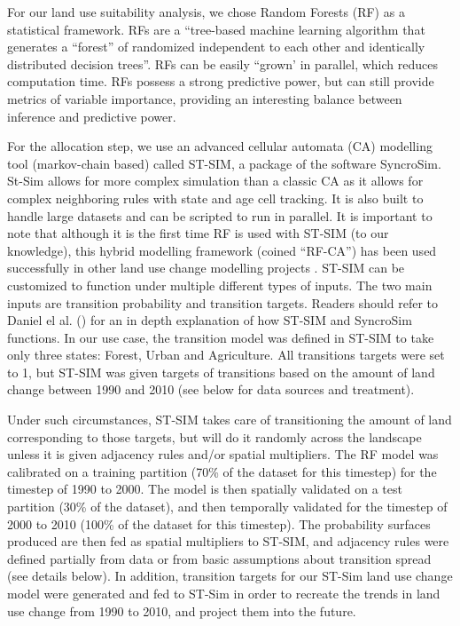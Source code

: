 For our land use suitability analysis, we chose Random Forests (RF) as a statistical framework. RFs are a “tree-based machine learning algorithm that generates a “forest” of randomized independent to each other and identically distributed decision trees”. RFs can be easily “grown’ in parallel, which reduces computation time. RFs possess a strong predictive power, but can still provide metrics of variable importance, providing an interesting balance between inference and predictive power.

For the allocation step, we use an advanced cellular automata (CA) modelling tool (markov-chain based) called ST-SIM, a package of the software SyncroSim. St-Sim allows for more complex simulation than a classic CA as it allows for complex neighboring rules with state and age cell tracking. It is also built to handle large datasets and can be scripted to run in parallel. It is important to note that although it is the first time RF is used with ST-SIM (to our knowledge), this hybrid modelling framework (coined “RF-CA”) has been used successfully in other land use change modelling projects \citep{kamusoko_simulating_2015, gounaridis_random_2019}. ST-SIM can be customized to function under multiple different types of inputs. The two main inputs are transition probability and transition targets. Readers should refer to Daniel el al. (\citeyear{daniel_state-and-transition_2016}) for an in depth explanation of how ST-SIM and SyncroSim functions. In our use case, the transition model was defined in ST-SIM to take only three states: Forest, Urban and Agriculture. All transitions targets were set to 1, but ST-SIM was given targets of transitions based on the amount of land change between 1990 and 2010 (see below for data sources and treatment).

Under such circumstances, ST-SIM takes care of transitioning the amount of land corresponding to those targets, but will do it randomly across the landscape unless it is given adjacency rules and/or spatial multipliers. The RF model was calibrated on a training partition (70\% of the dataset for this timestep) for the timestep of 1990 to 2000. The model is then spatially validated on a test partition (30\% of the dataset), and then temporally validated for the timestep of 2000 to 2010 (100\% of the dataset for this timestep). The probability surfaces produced are then fed as spatial multipliers to ST-SIM, and adjacency rules were  defined partially from data or from basic assumptions about transition spread (see details below). In addition, transition targets for our ST-Sim land use change model were generated and fed to ST-Sim in order to recreate the trends in land use change from 1990 to 2010, and project them into the future.\\

